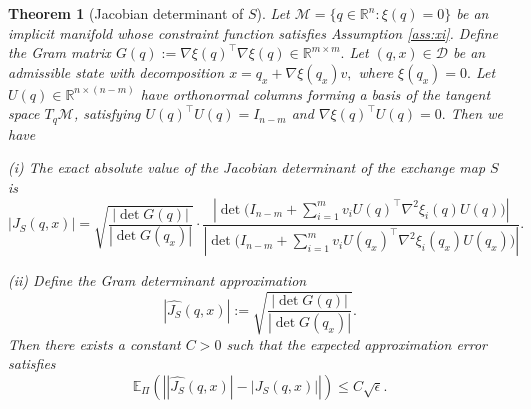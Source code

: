 \documentclass[10pt,a4paper]{amsart}
\newtheorem{theorem}{Theorem}
\begin{document}
\begin{theorem}[Jacobian determinant of $S$]
\label{thm:jacobian_gram}
Let 
\(
\mathcal M = \{q\in\mathbb R^n : \xi(q)=0\}
\)
be an implicit manifold whose constraint function satisfies Assumption \ref{ass:xi}. Define the Gram matrix
\(
G(q) := \nabla\xi(q)^\top \nabla\xi(q) \in \mathbb{R}^{m\times m}.
\)
Let $(q,x)\in\mathcal D$ be an admissible state with decomposition
\(
x = q_x + \nabla\xi(q_x)v,
\)
where
\(
\xi(q_x)=0.
\)
Let $U(q)\in\mathbb{R}^{n\times (n-m)}$ have orthonormal columns forming a basis of the tangent space $T_q\mathcal M$, satisfying
\(
U(q)^\top U(q)=I_{n-m}
\)
and
\(
\nabla\xi(q)^\top U(q)=0.
\) Then we have

\textnormal{(i)} The exact absolute value of the Jacobian determinant of the exchange map $S$ is
\begin{equation}\label{eq:jaco}
|J_S(q,x)| = \sqrt{\frac{|\det G(q)|}{|\det G(q_x)|}}
\cdot
\frac{
\left|\det\Big(I_{n-m} + \sum_{i=1}^m v_i U(q)^\top \nabla^2\xi_i(q) U(q)\Big)\right|
}{
\left|\det\Big(I_{n-m} + \sum_{i=1}^m v_i U(q_x)^\top \nabla^2\xi_i(q_x) U(q_x)\Big)\right|}.
\end{equation}

\textnormal{(ii)} Define the Gram determinant approximation
\begin{equation}\label{eq:appro}
|\widehat{J_S}(q,x)| :=
\sqrt{\frac{|\det G(q)|}{|\det G(q_x)|}}.
\end{equation}
Then there exists a constant $C>0$ such that the expected approximation error satisfies
\begin{equation}\label{eq:error}
\mathbb{E}_{\Pi}
\!\left(
\left\vert
|\widehat{J_S}(q,x)|
-
|J_S(q,x)|
\right\vert
\right)
\le C\sqrt{\epsilon}.
\end{equation}

\end{theorem}
\end{document}
